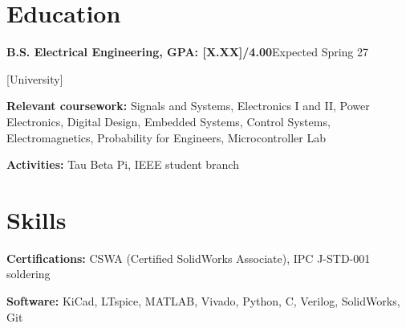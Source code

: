 \documentclass[letterpaper,11pt]{article}
\newcommand{\entry}[2]{\textbf{#1}\hfill #2\par}
\begin{document}
\section{Education}

\entry{B.S. Electrical Engineering, GPA: [X.XX]/4.00}{Expected Spring 27}
{[}University{]}\par
\textbf{Relevant coursework:} Signals and Systems, Electronics I and II, Power Electronics, Digital Design, Embedded Systems, Control Systems, Electromagnetics, Probability for Engineers, Microcontroller Lab\par
\textbf{Activities:} Tau Beta Pi, IEEE student branch\par

\section{Skills}

\textbf{Certifications:} CSWA (Certified SolidWorks Associate), IPC J-STD-001 soldering\par
\textbf{Software:} KiCad, LTspice, MATLAB, Vivado, Python, C, Verilog, SolidWorks, Git\par
\end{document}
